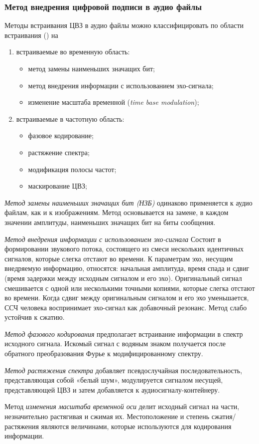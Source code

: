 
\subsubsection{Метод внедрения цифровой подписи в аудио файлы}
\par  Методы встраивания ЦВЗ в аудио файлы можно классифицировать по области встраивания (\cite{borisova2015}) на
\begin{enumerate}
\item встраиваемые во временную область:
		\begin{itemize}
			\item метод замены наименьших значащих бит;
			\item метод внедрения информации с использованием эхо-сигнала;
			\item изменение масштаба временной (\textit{time base modulation});
		\end{itemize}
\item встраиваемые в частотную область:
		\begin{itemize}
			\item фазовое кодирование;
			\item растяжение спектра;
			\item модификация полосы частот;
			\item маскирование ЦВЗ;
		\end{itemize}
\end{enumerate} 
\par \textit{Метод замены наименьших значащих бит (НЗБ)} одинаково применяется к аудио файлам, как и к изображениям. Метод основывается на замене, в каждом значении амплитуды, наименьших значащих бит на биты сообщения. 
\par \textit{ Метод внедрения информации с использованием эхо-сигнала} Состоит в формировании звукового потока, состоящего из смеси нескольких идентичных сигналов, которые слегка отстают во времени. К параметрам эхо, несущим внедряемую
информацию, относятся: начальная амплитуда, время спада и сдвиг (время задержки между исходным сигналом и его эхо). Оригинальный сигнал смешивается с одной или несколькими точными копиями, которые слегка отстают во времени. Когда сдвиг
между оригинальным сигналом и его эхо уменьшается, ССЧ человека воспринимает эхо-сигнал как добавочный резонанс. Метод слабо устойчив к сжатию.
\par \textit {Метод фазового кодирования} предполагает встраивание информации в спектр исходного сигнала. Искомый сигнал с водяным знаком получается после обратного преобразования Фурье к модифицированному спектру.
 \par \textit {Метод растяжения спектра} добавляет псевдослучайная последовательность, представляющая собой «белый шум», модулируется сигналом несущей, представляющей ЦВЗ и затем добавляется к аудиосигналу-контейнеру.
 \par Метод \textit {изменения масштаба временной оси}  делит исходный сигнал на части, незначительно
 растягивая и сжимая  их. Местоположение и степень сжатия/растяжения являются величинами, которые используются для кодирования информации.
 
